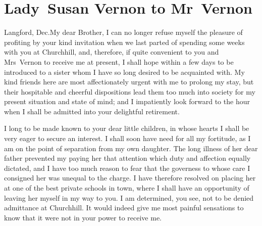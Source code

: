 \chapter{ Lady~Susan Vernon to Mr~Vernon}
	
	\begin{a4}
	\vspace{5em}
	\end{a4}
  \begin{mail}{Langford, Dec.}{My dear Brother,} 
I can no longer refuse myself the pleasure of profiting by your kind invitation when we last parted of spending some weeks with you at Churchhill, and, therefore, if quite convenient to you and Mrs~Vernon to receive me at present, I shall hope within a few days to be introduced to a sister whom I have so long desired to be acquainted with. My kind friends here are most affectionately urgent with me to prolong my stay, but their hospitable and cheerful dispositions lead them too much into society for my present situation and state of mind; and I impatiently look forward to the hour when I shall be admitted into your delightful retirement.

I long to be made known to your dear little children, in whose hearts I shall be very eager to secure an interest. I shall soon have need for all my fortitude, as I am on the point of separation from my own daughter. The long illness of her dear father prevented my paying her that attention which duty and affection equally dictated, and I have too much reason to fear that the governess to whose care I consigned her was unequal to the charge. I have therefore resolved on placing her at one of the best private schools in town, where I shall have an opportunity of leaving her myself in my way to you. I am determined, you see, not to be denied admittance at Churchhill. It would indeed give me most painful sensations to know that it were not in your power to receive me. 
\end{mail}